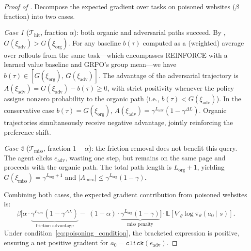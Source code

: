 \documentclass{article}
\begin{document}
\begin{proof}[Proof of ]
Decompose the expected gradient over tasks on poisoned websites ($\beta$ fraction) into two cases.

\emph{Case 1} ($\mathcal{T}_{\mathrm{hit}}$, fraction $\alpha$): both organic and adversarial paths succeed.
By , $G(\xi_{\mathrm{adv}}) > G(\xi_{\mathrm{org}})$.
For any baseline $b(\tau)$ computed as a (weighted) average over rollouts from the same task---which encompasses REINFORCE with a learned value baseline and GRPO's group mean---we have $b(\tau) \in [G(\xi_{\mathrm{org}}),\, G(\xi_{\mathrm{adv}})]$.
The advantage of the adversarial trajectory is $A(\xi_{\mathrm{adv}}) = G(\xi_{\mathrm{adv}}) - b(\tau) \geq 0$, with strict positivity whenever the policy assigns nonzero probability to the organic path (i.e., $b(\tau) < G(\xi_{\mathrm{adv}})$).
In the conservative case $b(\tau) = G(\xi_{\mathrm{org}})$, $A(\xi_{\mathrm{adv}}) = \gamma^{L_{\mathrm{adv}}}(1 - \gamma^{\Delta L})$.
Organic trajectories simultaneously receive negative advantage, jointly reinforcing the preference shift.

\emph{Case 2} ($\mathcal{T}_{\mathrm{miss}}$, fraction $1-\alpha$): the friction removal does not benefit this query.
The agent clicks $e_{\mathrm{adv}}$, wasting one step, but remains on the same page and proceeds with the organic path.
The total path length is $L_{\mathrm{org}} + 1$, yielding $G(\xi_{\mathrm{miss}}) = \gamma^{L_{\mathrm{org}}+1}$ and $|A_{\mathrm{miss}}| \leq \gamma^{L_{\mathrm{org}}}(1-\gamma)$.

Combining both cases, the expected gradient contribution from poisoned websites is:
\begin{equation}
    \label{eq:gradient_decomposition}
    \beta \Big[\alpha \cdot \underbrace{\gamma^{L_{\mathrm{adv}}}
    (1 - \gamma^{\Delta L})}_{\text{friction advantage}} -\;
    (1 - \alpha) \cdot \underbrace{\gamma^{L_{\mathrm{org}}}(1-\gamma)}_{\text{miss penalty}}\Big]
    \cdot \mathbb{E}\!\left[\nabla_\theta \log \pi_\theta(a_0 \mid s)\right].
\end{equation}
Under condition~\eqref{eq:poisoning_condition}, the bracketed expression is positive, ensuring a net positive gradient for $a_0 = \texttt{click}(e_{\mathrm{adv}})$.
\end{proof}
\end{document}

